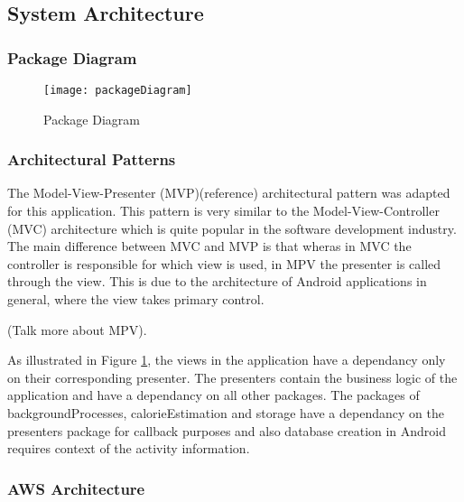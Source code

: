 \subsection*{System Architecture}

\subsubsection*{Package Diagram}
\begin{figure}[h]
    \texttt{[image: packageDiagram]}
    \caption{Package Diagram}
    \label{fig:packageDiagram}
\end{figure}

\subsubsection*{Architectural Patterns}
The Model-View-Presenter (MVP)(reference) architectural pattern was adapted for this application.
This pattern is very similar to the Model-View-Controller (MVC) architecture which is quite popular in the software development industry.
The main difference between MVC and MVP is that wheras in MVC the controller is responsible for which view is used, in MPV the presenter is called through the view.
This is due to the architecture of Android applications in general, where the view takes primary control.

(Talk more about MPV).

As illustrated in Figure \ref{fig:packageDiagram}, the views in the application have a dependancy only on their corresponding presenter.
The presenters contain the business logic of the  application and have a dependancy on all other packages.
The packages of backgroundProcesses, calorieEstimation and storage have a dependancy on the presenters package for callback purposes and also database creation in Android requires context of the activity information.

\subsubsection*{AWS Architecture}

